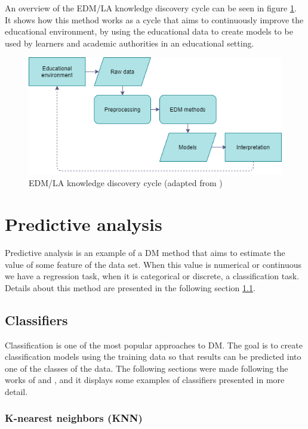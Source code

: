 An overview of the EDM/LA knowledge discovery cycle can be seen in figure \ref{fig:edm}. It shows how this method works as a cycle that aims to continuously improve the educational environment, by using the educational data to create models to be used by learners and academic authorities in an educational setting.

\begin{figure}[htb]
	\centering
  	\includegraphics[scale=.7]{Imagens/edm.png}
  	\caption{EDM/LA knowledge discovery cycle (adapted from \cite{linan2015educational})}
  	\label{fig:edm}
\end{figure}

\section{Predictive analysis}

Predictive analysis is an example of a DM method that aims to estimate the value of some feature of the data set. When this value is numerical or continuous we have a regression task, when it is categorical or discrete, a classification task. Details about this method are presented in the following section \ref{sc:class}.

\subsection{Classifiers}
\label{sc:class}

Classification is one of the most popular approaches to DM. The goal is to create classification models using the training data so that results can be predicted into one of the classes of the data. The following sections were made following the works of \cite{bramer2007principles} and \cite{larose2006data}, and it displays some examples of classifiers presented in more detail.

\subsubsection{K-nearest neighbors (KNN)}

